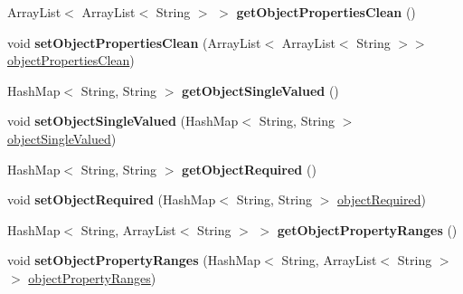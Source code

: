 \begin{DoxyCompactItemize}
\item 
\hypertarget{class_data_base_1_1_tables_a8672a5216105a348c0719724ec56fdba}{
ArrayList$<$ ArrayList$<$ String $>$ $>$ {\bfseries getObjectPropertiesClean} ()}
\label{class_data_base_1_1_tables_a8672a5216105a348c0719724ec56fdba}

\item 
\hypertarget{class_data_base_1_1_tables_adcdf3af4edd0f1edae29d53baf10cd67}{
void {\bfseries setObjectPropertiesClean} (ArrayList$<$ ArrayList$<$ String $>$$>$ \hyperlink{class_data_base_1_1_tables_aefcb4c8a578671a32a64c3196281f479}{objectPropertiesClean})}
\label{class_data_base_1_1_tables_adcdf3af4edd0f1edae29d53baf10cd67}

\item 
\hypertarget{class_data_base_1_1_tables_a5c052fa560c9cf209239d22bd277dfaa}{
HashMap$<$ String, String $>$ {\bfseries getObjectSingleValued} ()}
\label{class_data_base_1_1_tables_a5c052fa560c9cf209239d22bd277dfaa}

\item 
\hypertarget{class_data_base_1_1_tables_a8e525dceed00c8db3710913f02dfc98e}{
void {\bfseries setObjectSingleValued} (HashMap$<$ String, String $>$ \hyperlink{class_data_base_1_1_tables_ae379376430f85d3c7cef16bf1a962ff1}{objectSingleValued})}
\label{class_data_base_1_1_tables_a8e525dceed00c8db3710913f02dfc98e}

\item 
\hypertarget{class_data_base_1_1_tables_a1e14c688b73c58acdd00e37fa03e9a65}{
HashMap$<$ String, String $>$ {\bfseries getObjectRequired} ()}
\label{class_data_base_1_1_tables_a1e14c688b73c58acdd00e37fa03e9a65}

\item 
\hypertarget{class_data_base_1_1_tables_ab25f6ae6e35aff6a3318da5128376036}{
void {\bfseries setObjectRequired} (HashMap$<$ String, String $>$ \hyperlink{class_data_base_1_1_tables_a11874c966b0f22fc88b7fb46cb3331ed}{objectRequired})}
\label{class_data_base_1_1_tables_ab25f6ae6e35aff6a3318da5128376036}

\item 
\hypertarget{class_data_base_1_1_tables_aba5a86d237192b92c71f05fd9cb70573}{
HashMap$<$ String, ArrayList$<$ String $>$ $>$ {\bfseries getObjectPropertyRanges} ()}
\label{class_data_base_1_1_tables_aba5a86d237192b92c71f05fd9cb70573}

\item 
\hypertarget{class_data_base_1_1_tables_abc4efc7ae4a231d68dcde9d9b5ab22f0}{
void {\bfseries setObjectPropertyRanges} (HashMap$<$ String, ArrayList$<$ String $>$$>$ \hyperlink{class_data_base_1_1_tables_af580afd6f42aac3503cecab2e615ef73}{objectPropertyRanges})}
\label{class_data_base_1_1_tables_abc4efc7ae4a231d68dcde9d9b5ab22f0}


\end{DoxyCompactItemize}
